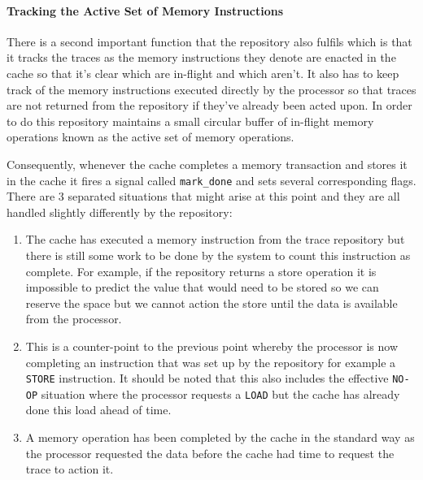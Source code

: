 \paragraph{Tracking the Active Set of Memory Instructions}

There is a second important function that the repository also fulfils which is that it tracks the traces as the memory instructions they denote are enacted in the cache so that it's clear which are in-flight and which aren't. It also has to keep track of the memory instructions executed directly by the processor so that traces are not returned from the repository if they've already been acted upon. In order to do this repository maintains a small circular buffer of in-flight memory operations known as the active set of memory operations. 

Consequently, whenever the cache completes a memory transaction and stores it in the cache it fires a signal called \texttt{mark\_done} and sets several corresponding flags. There are 3 separated situations that might arise at this point and they are all handled slightly differently by the repository:

\begin{enumerate}
	\item The cache has executed a memory instruction from the trace repository but there is still some work to be done by the system to count this instruction as complete. For example, if the repository returns a store operation it is impossible to predict the value that would need to be stored so we can reserve the space but we cannot action the store until the data is available from the processor.
	\item This is a counter-point to the previous point whereby the processor is now completing an instruction that was set up by the repository for example a \texttt{STORE} instruction. It should be noted that this also includes the effective \texttt{NO-OP} situation where the processor requests a \texttt{LOAD} but the cache has already done this load ahead of time. 
	\item A memory operation has been completed by the cache in the standard way as the processor requested the data before the cache had time to request the trace to action it.
\end{enumerate} 

